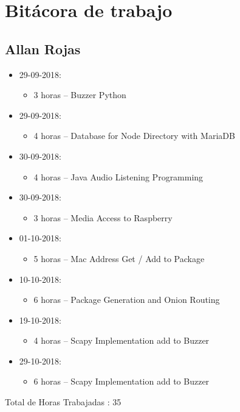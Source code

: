 \documentclass{article}
\begin{document}
\section{Bit\'acora de trabajo}
\subsection{Allan Rojas}
\begin{itemize}
  \item 29-09-2018:
  \begin{itemize}
    \item 3 horas – Buzzer Python
  \end{itemize}
  \item 29-09-2018:
  \begin{itemize}
    \item 4 horas – Database for Node Directory with MariaDB
  \end{itemize}
  \item 30-09-2018:
  \begin{itemize}
    \item 4 horas – Java Audio Listening Programming
  \end{itemize}
  \item 30-09-2018:
  \begin{itemize}
    \item 3 horas – Media Access to Raspberry
  \end{itemize}
  \item 01-10-2018:
  \begin{itemize}
    \item 5 horas – Mac Address Get / Add to Package
  \end{itemize}
  \item 10-10-2018:
  \begin{itemize}
    \item 6 horas – Package Generation and Onion Routing
  \end{itemize}
  \item 19-10-2018:
  \begin{itemize}
    \item 4 horas – Scapy Implementation add to Buzzer
  \end{itemize}
  \item 29-10-2018:
  \begin{itemize}
    \item 6 horas – Scapy Implementation add to Buzzer
  \end{itemize}
\end{itemize}
Total de Horas Trabajadas : 35
\end{document}
